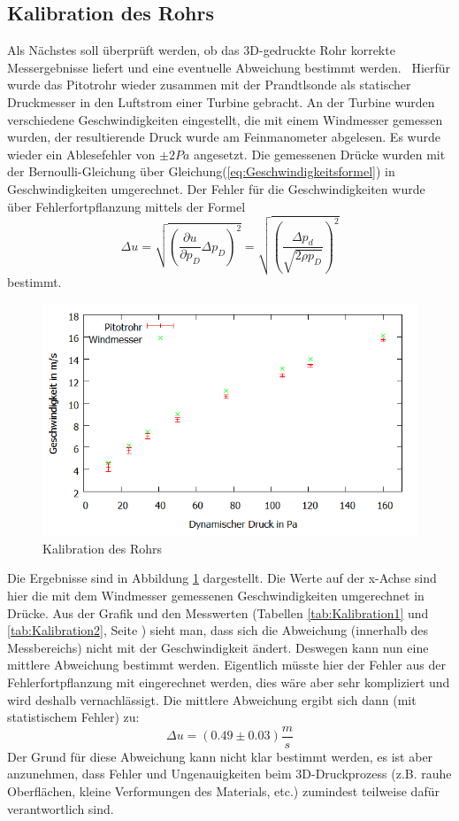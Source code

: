 \subsection{Kalibration des Rohrs}
Als Nächstes soll überprüft werden, ob das 3D-gedruckte Rohr korrekte Messergebnisse liefert und eine eventuelle Abweichung bestimmt werden.
\
Hierfür wurde das Pitotrohr wieder zusammen mit der Prandtlsonde als statischer Druckmesser in den Luftstrom einer Turbine gebracht. An der Turbine wurden verschiedene Geschwindigkeiten eingestellt, die mit einem Windmesser gemessen wurden, der resultierende Druck wurde am Feinmanometer abgelesen. Es wurde wieder ein Ablesefehler von $\pm 2 Pa$ angesetzt. Die gemessenen Drücke wurden mit der Bernoulli-Gleichung über Gleichung(\ref{eq:Geschwindigkeitsformel}) in Geschwindigkeiten umgerechnet.
Der Fehler für die Geschwindigkeiten wurde über Fehlerfortpflanzung mittels der Formel
\begin{equation}
\Delta u=\sqrt{\left(\frac{\partial u}{\partial p_D}\Delta p_D\right)^2}=\sqrt{\left(\frac{\Delta p_d}{\sqrt{2\rho p_D}}\right)^2}
\label{eq:Fehlerfortpflanzung}
\end{equation}
bestimmt.
\begin{figure}
      \includegraphics[width=.9\textwidth]{images/Kalibration}
\caption{Kalibration des Rohrs}
\label{fig:Kalibration}
\end{figure}
Die Ergebnisse sind in Abbildung \ref{fig:Kalibration} dargestellt. Die Werte auf der x-Achse sind hier die mit dem Windmesser gemessenen Geschwindigkeiten umgerechnet in Drücke. Aus der Grafik und den Messwerten (Tabellen \ref{tab:Kalibration1} und \ref{tab:Kalibration2}, Seite \pageref{tab:Kalibration2}) sieht man, dass sich die Abweichung (innerhalb des Messbereichs) nicht mit der Geschwindigkeit ändert. Deswegen kann nun eine mittlere Abweichung bestimmt werden. Eigentlich müsste hier der Fehler aus der Fehlerfortpflanzung mit eingerechnet werden, dies wäre aber sehr kompliziert und wird deshalb vernachlässigt. Die mittlere Abweichung ergibt sich dann (mit statistischem Fehler) zu:
\begin{equation}
\Delta u= \left(0.49 \pm 0.03\right) \frac{m}{s}
\label{eq:Abweichung}
\end{equation}
Der Grund für diese Abweichung kann nicht klar bestimmt werden, es ist aber anzunehmen, dass Fehler und Ungenauigkeiten beim 3D-Druckprozess (z.B. rauhe Oberflächen, kleine Verformungen des Materials, etc.) zumindest teilweise dafür verantwortlich sind.
